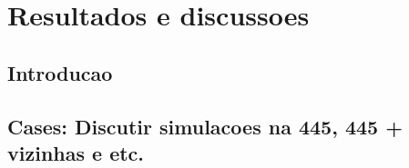 \chapter{Resultados e discussoes}
\label{CapSolucoes}

\section{Introducao}

\section{Cases: Discutir simulacoes na 445, 445 + vizinhas e etc.}
